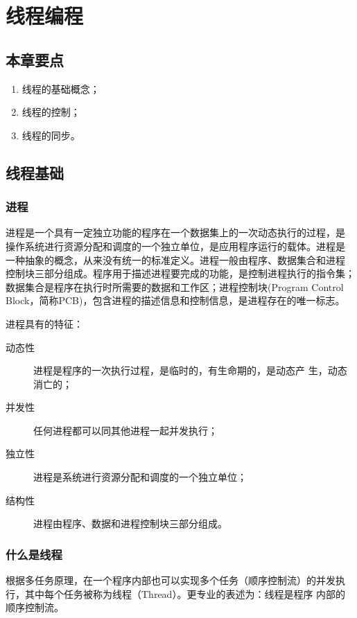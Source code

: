 \chapter*{线程编程}
\label{chp:Java-thread-programming}

\section*{本章要点}

\sline
\begin{enumerate}
\item 线程的基础概念；
\item 线程的控制；
\item 线程的同步。
\end{enumerate}  
\sline

\section{线程基础}

\subsection{进程}

进程是一个具有一定独立功能的程序在一个数据集上的一次动态执行的过程，是
操作系统进行资源分配和调度的一个独立单位，是应用程序运行的载体。进程是
一种抽象的概念，从来没有统一的标准定义。进程一般由程序、数据集合和进程
控制块三部分组成。程序用于描述进程要完成的功能，是控制进程执行的指令集；
数据集合是程序在执行时所需要的数据和工作区；进程控制块(Program Control
Block，简称PCB)，包含进程的描述信息和控制信息，是进程存在的唯一标志。

进程具有的特征：

\begin{description}
\item[动态性] 进程是程序的一次执行过程，是临时的，有生命期的，是动态产
  生，动态消亡的；
\item[并发性] 任何进程都可以同其他进程一起并发执行；
\item[独立性] 进程是系统进行资源分配和调度的一个独立单位；
\item[结构性] 进程由程序、数据和进程控制块三部分组成。
\end{description}

\subsection{什么是线程}

根据多任务原理，在一个程序内部也可以实现多个任务（顺序控制流）的并发执
行，其中每个任务被称为线程（Thread）。更专业的表述为：{\hei 线程是程序
  内部的顺序控制流。}

